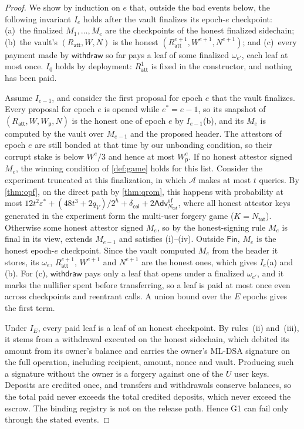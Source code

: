 \documentclass[10pt,journal,compsoc]{IEEEtran}
\theoremstyle{tplain}
\theoremstyle{tdef}
\theoremstyle{remark}
\newcommand{\Adv}{\mathsf{Adv}}
\newcommand{\Wp}{W_{\mathsf{p}}}
\newcommand{\Ratt}{R_{\mathsf{att}}}
\begin{document}
\begin{proof}
We show by induction on $e$ that, outside the bad events below, the following invariant $I_e$ holds after the vault finalizes its epoch-$e$ checkpoint: (a)~the finalized $M_1,\dots,M_e$ are the checkpoints of the honest finalized sidechain; (b)~the vault's $(\Ratt,W,N)$ is the honest $(\Ratt^{e+1},W^{e+1},N^{e+1})$; and (c)~every payment made by $\mathsf{withdraw}$ so far pays a leaf of some finalized $\omega_{e'}$, each leaf at most once. $I_0$ holds by deployment: $\Ratt^{1}$ is fixed in the constructor, and nothing has been paid.

Assume $I_{e-1}$, and consider the first proposal for epoch $e$ that the vault finalizes. Every proposal for epoch $e$ is opened while $e^\ast=e-1$, so its snapshot of $(\Ratt,W,\Wp,N)$ is the honest one of epoch $e$ by $I_{e-1}$(b), and its $M_e$ is computed by the vault over $M_{e-1}$ and the proposed header. The attestors of epoch $e$ are still bonded at that time by our unbonding condition, so their corrupt stake is below $W^e/3$ and hence at most $\Wp^e$. If no honest attestor signed $M_e$, the winning condition of \cref{def:game} holds for this list. Consider the experiment truncated at this finalization, in which $\mathcal A$ makes at most $t$ queries. By \cref{thm:opf}, on the direct path by \cref{thm:qrom}, this happens with probability at most $12t^2\varepsilon^\ast+(48t^3+2q_V)/2^h+\delta_{\mathsf{col}}+2\Adv^{\mathsf{uf}}_{N_{\mathsf{tot}}}$, where all honest attestor keys generated in the experiment form the multi-user forgery game ($K=N_{\mathsf{tot}}$). Otherwise some honest attestor signed $M_e$, so by the honest-signing rule $M_e$ is final in its view, extends $M_{e-1}$ and satisfies (i)--(iv). Outside $\mathsf{Fin}$, $M_e$ is the honest epoch-$e$ checkpoint. Since the vault computed $M_e$ from the header it stores, its $\omega_e$, $\Ratt^{e+1}$, $W^{e+1}$ and $N^{e+1}$ are the honest ones, which gives $I_e$(a) and (b). For (c), $\mathsf{withdraw}$ pays only a leaf that opens under a finalized $\omega_{e'}$, and it marks the nullifier spent before transferring, so a leaf is paid at most once even across checkpoints and reentrant calls. A union bound over the $E$ epochs gives the first term.

Under $I_E$, every paid leaf is a leaf of an honest checkpoint. By rules~(ii) and~(iii), it stems from a withdrawal executed on the honest sidechain, which debited its amount from its owner's balance and carries the owner's ML-DSA signature on the full operation, including recipient, amount, nonce and vault. Producing such a signature without the owner is a forgery against one of the $U$ user keys. Deposits are credited once, and transfers and withdrawals conserve balances, so the total paid never exceeds the total credited deposits, which never exceed the escrow. The binding registry is not on the release path. Hence G1 can fail only through the stated events.
\end{proof}
\end{document}
